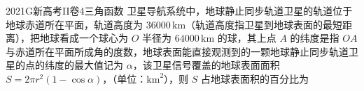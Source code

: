 
\begin{problem}{2021}{G}{新高考II卷}{4}{三角函数}
卫星导航系统中，地球静止同步轨道卫星的轨道位于地球赤道所在平面，轨道高度为 $ 36000\,\mathrm{km} $（轨道高度指卫星到地球表面的最短距离），把地球看成一个球心为 $ O $ 半径为 $ 64000\,\mathrm{km} $ 的球，其上点 $ A $ 的纬度是指 $ OA $ 与赤道所在平面所成角的度数，地球表面能直接观测到的一颗地球静止同步轨道卫星的点的纬度的最大值记为 $ \alpha $，该卫星信号覆盖的地球表面面积 $ S=2\pi r^{2}(1-\cos\alpha) $，（单位：$ \mathrm{km}^{2} $），则 $ S $ 占地球表面积的百分比为
\begin{choices}
\end{choices}
\end{problem}

\begin{answer}

\end{answer}

\begin{solutions}

\end{solutions}